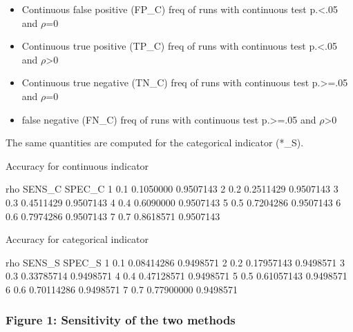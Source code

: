 \documentclass{article}
\begin{document}
\begin{itemize}
  \item Continuous false positive (FP\_C)  freq of runs with continuous test p.<.05 and \(\rho\)=0  
  \item Continuous true positive (TP\_C)  freq of runs with continuous test p.<.05 and \(\rho\)>0
  \item Continuous true negative (TN\_C)  freq of runs  with continuous test p.>=.05 and \(\rho\)=0
  \item false negative (FN\_C)  freq of runs  with continuous test p.>=.05 and \(\rho\)>0
\end{itemize}

The same quantities are computed for the categorical indicator (*\_S).

\begin{Schunk}
\begin{Soutput}
Accuracy for continuous indicator
\end{Soutput}
\begin{Soutput}
  rho    SENS_C    SPEC_C
1 0.1 0.1050000 0.9507143
2 0.2 0.2511429 0.9507143
3 0.3 0.4511429 0.9507143
4 0.4 0.6090000 0.9507143
5 0.5 0.7204286 0.9507143
6 0.6 0.7974286 0.9507143
7 0.7 0.8618571 0.9507143
\end{Soutput}
\begin{Soutput}
Accuracy for categorical indicator
\end{Soutput}
\begin{Soutput}
  rho     SENS_S    SPEC_S
1 0.1 0.08414286 0.9498571
2 0.2 0.17957143 0.9498571
3 0.3 0.33785714 0.9498571
4 0.4 0.47128571 0.9498571
5 0.5 0.61057143 0.9498571
6 0.6 0.70114286 0.9498571
7 0.7 0.77900000 0.9498571
\end{Soutput}
\end{Schunk}


\subsubsection*{Figure 1: Sensitivity of the two methods}
\end{document}
